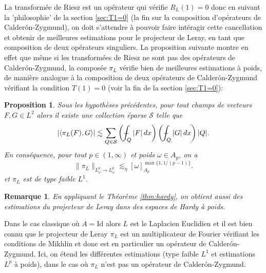 \documentclass[11pt]{amsart}
\newtheorem{proposition}[theorem]{Proposition}
\newtheorem*{remark}{Remarque}
\newcommand{\mcS}{{\mathcal S}}
\def\Xint#1{\mathchoice
   {\XXint\displaystyle\textstyle{#1}}%
   {\XXint\textstyle\scriptstyle{#1}}%
   {\XXint\scriptstyle\scriptscriptstyle{#1}}%
   {\XXint\scriptscriptstyle\scriptscriptstyle{#1}}%
   \!\int}
\def\XXint#1#2#3{{\setbox0=\hbox{$#1{#2#3}{\int}$}
     \vcenter{\hbox{$#2#3$}}\kern-.5\wd0}}
\def\aver#1{\Xint-_{#1}}
\begin{document}
\medskip


La transform\'ee de Riesz est un op\'erateur qui v\'erifie $R_L(1)=0$ donc en suivant la 'philosophie' de la section \ref{sec:T1=0} (la fin sur la composition d'op\'erateurs de Calder\'on-Zygmund), on doit s'attendre \`a pouvoir faire int\'eragir cette cancellation et obtenir de meilleures estimations pour le projecteur de Leray, en tant que composition de deux op\'erateurs singuliers. La proposition suivante montre en effet que m\^eme si les transform\'ees de Riesz ne sont pas des op\'erateurs de Calder\'on-Zygmund, la compos\'ee $\pi_L$ v\'erifie bien de meilleures estimations \`a poids, de mani\`ere analogue \`a la composition de deux op\'erateurs de Calder\'on-Zygmund v\'erifiant la condition $T(1)=0$ (voir la fin de la section \ref{sec:T1=0}):

\begin{proposition} Sous les hypoth\`eses pr\'ec\'edentes, pour tout champs de vecteurs $F,G \in L^2$ alors il existe une collection \'eparse $\mcS$ telle que
$$ \left|\langle \pi_L(F),G\rangle \right| \lesssim \sum_{Q\in \mcS} \left(\aver{Q} |F| \, dx\right) \left(\aver{Q} |G| \, dx\right) |Q|.$$
En cons\'equence, pour tout $p\in(1,\infty)$ et poids $\omega \in A_{p}$, on a
$$ \| \pi_L  \|_{L^p_\omega \to L^p_\omega} \lesssim_\eta [\omega]_{A_{p}}^{\max\{1,1/(p-1)\}}.$$
et $\pi_L$ est de type faible $L^1$.
\end{proposition}

\begin{remark} En appliquant le Th\'eor\`eme \ref{thm:hardy}, on obtient aussi des estimations du projecteur de Leray dans des espaces de Hardy \`a poids.
\end{remark}

Dans le cas classique o\`u $A=\textrm{Id}$ alors $L$ est le Laplacien Euclidien et il est bien connu que le projecteur de Leray $\pi_L$ est un multiplicateur de Fourier v\'erifiant les conditions de Mikhlin et donc est en particulier un op\'erateur de Calder\'on-Zygmund. Ici, on \'etend les diff\'erentes estimations (type faible $L^1$ et estimations $L^p$ \`a poids), dans le cas o\`u $\pi_L$ n'est pas un op\'erateur de Calder\'on-Zygmund.
\end{document}
